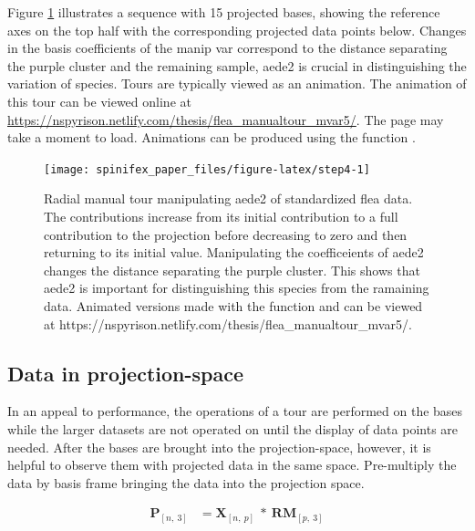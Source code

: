 Figure \ref{fig:step4} illustrates a sequence with 15 projected bases,
showing the reference axes on the top half with the corresponding
projected data points below. Changes in the basis coefficients of the
manip var correspond to the distance separating the purple cluster and
the remaining sample, aede2 is crucial in distinguishing the variation
of species. Tours are typically viewed as an animation. The animation of
this tour can be viewed online at
\url{https://nspyrison.netlify.com/thesis/flea_manualtour_mvar5/}. The
page may take a moment to load. Animations can be produced using the
function .

\begin{Schunk}
\begin{figure}

{\centering \texttt{[image: spinifex\_paper\_files/figure-latex/step4-1]} 

}

\caption[Radial manual tour manipulating aede2 of standardized flea data]{Radial manual tour manipulating aede2 of standardized flea data.  The contributions increase from its initial contribution to a full contribution to the projection before decreasing to zero and then returning to its initial value. Manipulating the coefficeients of aede2 changes the distance separating the purple cluster. This shows that aede2 is important for distinguishing this species from the ramaining data. Animated versions made with the  function and can be viewed at https://nspyrison.netlify.com/thesis/flea\_manualtour\_mvar5/.}\label{fig:step4}
\end{figure}
\end{Schunk}

\hypertarget{sec:display}{%
\subsection{Data in projection-space}\label{sec:display}}

In an appeal to performance, the operations of a tour are performed on
the bases while the larger datasets are not operated on until the
display of data points are needed. After the bases are brought into the
projection-space, however, it is helpful to observe them with projected
data in the same space. Pre-multiply the data by basis frame bringing
the data into the projection space.

\begin{align*}
  \textbf{P}_{[n,~3]} &= \textbf{X}_{[n,~p]} ~*~ \textbf{RM}_{[p,~3]}
\end{align*}


